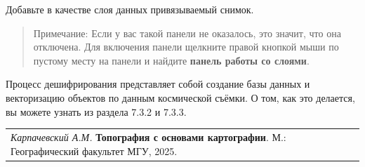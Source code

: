 \documentclass[
  12pt,
]{book}
\begin{document}
Добавьте в качестве слоя данных привязываемый снимок.

\begin{quote}
Примечание: Если у вас такой панели не оказалось, это значит, что она отключена. Для включения панели щелкните правой кнопкой мыши по пустому месту на панели и найдите \textbf{панель работы со слоями}.
\end{quote}

Процесс дешифрирования представляет собой создание базы данных и векторизацию объектов по данным космической съёмки. О том, как это делается, вы можете узнать из раздела 7.3.2 и 7.3.3.

\begin{longtable}[]{@{}l@{}}
\toprule\noalign{}
\endhead
\bottomrule\noalign{}
\endlastfoot
\emph{Карпачевский А.М.} \textbf{Топография с основами картографии}. М.: Географический факультет МГУ, 2025. \\
\end{longtable}

  
\end{document}
